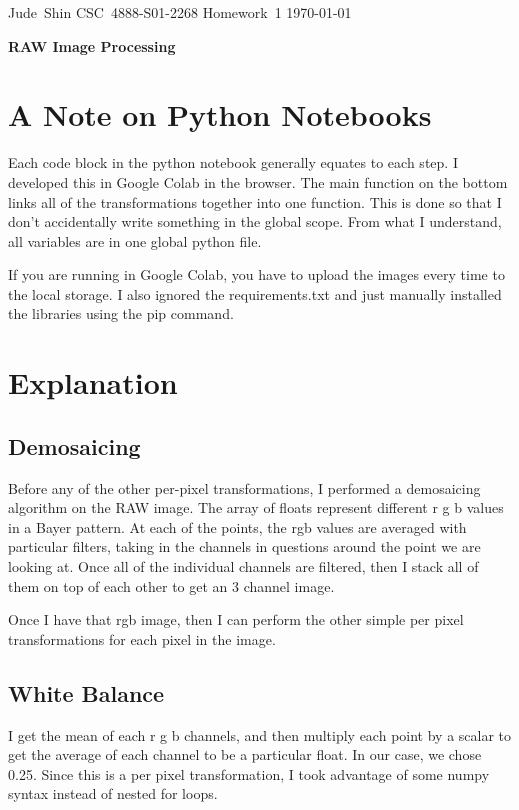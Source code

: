 \documentclass[11pt]{article}
\begin{document}
\hfill\vbox{\hbox{Jude Shin}
		\hbox{CSC 4888-S01-2268}	
		\hbox{Homework 1}	
		\hbox{\today}}\par

\bigskip
\centerline{\Large\bf RAW Image Processing}\par
\bigskip

\section{A Note on Python Notebooks}

Each code block in the python notebook generally equates to each step.
I developed this in Google Colab in the browser.
The main function on the bottom links all of the transformations together into one function.
This is done so that I don't accidentally write something in the global scope.
From what I understand, all variables are in one global python file.

If you are running in Google Colab, you have to upload the images every time to the local storage.
I also ignored the requirements.txt and just manually installed the libraries using the pip command.

\section{Explanation}

\subsection{Demosaicing}

Before any of the other per-pixel transformations, I performed a demosaicing algorithm on the RAW image. 
The array of floats represent different r g b values in a Bayer pattern.
At each of the points, the rgb values are averaged with particular filters, taking in the channels in questions around the point we are looking at.
Once all of the individual channels are filtered, then I stack all of them on top of each other to get an 3 channel image.

Once I have that rgb image, then I can perform the other simple per pixel transformations for each pixel in the image.

\subsection{White Balance}

I get the mean of each r g b channels, and then multiply each point by a scalar to get the average of each channel to be a particular float.
In our case, we chose 0.25.
Since this is a per pixel transformation, I took advantage of some numpy syntax instead of nested for loops.
\end{document}
